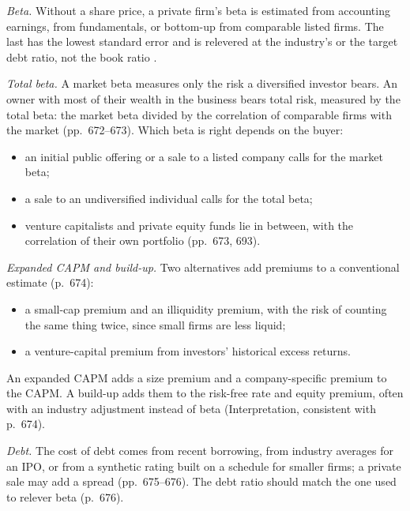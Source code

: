 \begin{qfmethod}\label{meth:private-discount-rate}
 \emph{Beta.} Without a share price, a private firm's beta is estimated from accounting earnings, from fundamentals, or bottom-up from comparable listed firms. The last has the lowest standard error and is relevered at the industry's or the target debt ratio, not the book ratio \citep[pp.~669--672]{investment-valuation-2012}.

\emph{Total beta.} A market beta measures only the risk a diversified investor bears. An owner with most of their wealth in the business bears total risk, measured by the total beta: the market beta divided by the correlation of comparable firms with the market (pp.~672--673). Which beta is right depends on the buyer:
\begin{itemize}
\item an initial public offering or a sale to a listed company calls for the market beta;
\item a sale to an undiversified individual calls for the total beta;
\item venture capitalists and private equity funds lie in between, with the correlation of their own portfolio (pp.~673, 693).
\end{itemize}

\emph{Expanded CAPM and build-up.} Two alternatives add premiums to a conventional estimate (p.~674):
\begin{itemize}
\item a small-cap premium and an illiquidity premium, with the risk of counting the same thing twice, since small firms are less liquid;
\item a venture-capital premium from investors' historical excess returns.
\end{itemize}
An expanded CAPM adds a size premium and a company-specific premium to the CAPM. A build-up adds them to the risk-free rate and equity premium, often with an industry adjustment instead of beta (Interpretation, consistent with p.~674).

\emph{Debt.} The cost of debt comes from recent borrowing, from industry averages for an IPO, or from a synthetic rating built on a schedule for smaller firms; a private sale may add a spread (pp.~675--676). The debt ratio should match the one used to relever beta (p.~676).


\end{qfmethod}

